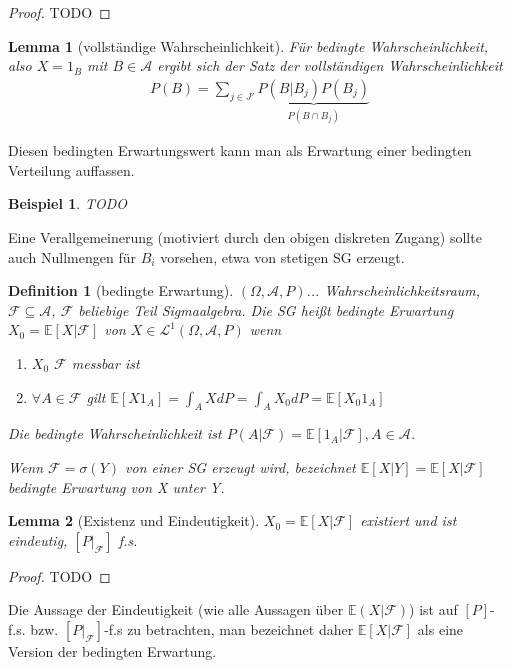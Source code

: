 \documentclass[]{article}
\newtheorem{lemma}{Lemma}
\newtheorem{definition}{Definition}
\newtheorem*{example}{Beispiel}
\begin{document}
\begin{proof}
	TODO
\end{proof}

\begin{lemma}[vollständige Wahrscheinlichkeit]
	Für bedingte Wahrscheinlichkeit, also $X=1_B$ mit $B\in\mathcal{A}$ ergibt sich der Satz der vollständigen Wahrscheinlichkeit
	\begin{align*}
		P(B) = \sum_{j\in J'} \underbrace{P(B|B_j)P(B_j)}_{P(B\cap B_j)}
	\end{align*}
\end{lemma}

Diesen bedingten Erwartungswert kann man als Erwartung einer bedingten Verteilung auffassen.

\begin{example}
	TODO
\end{example}

Eine Verallgemeinerung (motiviert durch den obigen diskreten Zugang) sollte auch Nullmengen für $B_i$ vorsehen, etwa von stetigen SG erzeugt.

\begin{definition}[bedingte Erwartung]
	$(\Omega, \mathcal{A}, P)$... Wahrscheinlichkeitsraum, $\mathcal{F}\subseteq \mathcal{A}$, $\mathcal{F}$ beliebige Teil Sigmaalgebra. Die SG heißt bedingte Erwartung $X_0 = \mathbb{E}[X|\mathcal{F}]$ von $X\in \mathcal{L}^1(\Omega, \mathcal{A}, P)$ wenn
	\begin{enumerate}
		\item $X_0$ $\mathcal{F}$ messbar ist
		\item $\forall A \in \mathcal{F}$ gilt $\mathbb{E}[X 1_A] = \int_A X dP = \int_A X_0 dP = \mathbb{E}[X_0 1_A]$
	\end{enumerate}
	Die bedingte Wahrscheinlichkeit ist $P(A|\mathcal{F})=\mathbb{E}[1_A|\mathcal{F}], A\in \mathcal{A}$.
	
	Wenn $\mathcal{F}=\sigma(Y)$ von einer SG erzeugt wird, bezeichnet $\mathbb{E}[X|Y]=\mathbb{E}[X|\mathcal{F}]$ bedingte Erwartung von X unter Y.
\end{definition}

\begin{lemma}[Existenz und Eindeutigkeit]
	$X_0=\mathbb{E}[X|\mathcal{F}]$ existiert und ist eindeutig, $[P|_\mathcal{F}]$ f.s.
\end{lemma}

\begin{proof}
	TODO
\end{proof}

Die Aussage der Eindeutigkeit (wie alle Aussagen über $\mathbb{E}(X|\mathcal{F})$) ist auf $[P]$-f.s. bzw. $[P|_\mathcal{F}]$-f.s zu betrachten, man bezeichnet daher $\mathbb{E}[X|\mathcal{F}]$ als eine Version der bedingten Erwartung.
\end{document}
